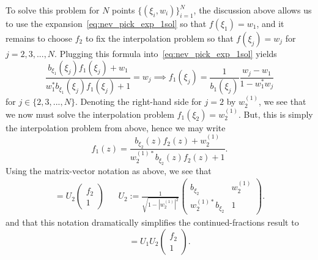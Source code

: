 To solve this problem for $N$ points $\{(\xi_i, w_i)\}_{i = 1}^N$, the discussion above allows us to use the expansion~\eqref{eq:nev_pick_exp_1sol} so that $f(\xi_1) = w_1$, and it remains to choose $f_2$ to fix the interpolation problem so that $f(\xi_j) = w_j$ for $j = 2, 3, ..., N$. Plugging this formula into~\eqref{eq:nev_pick_exp_1sol} yields 
\begin{equation}
    \frac{b_{\xi_1}(\xi_j) f_1(\xi_j) + w_1}{w_1^* b_{\xi_1}(\xi_j) f_1(\xi_j) + 1} = w_j \implies f_1(\xi_j) = \frac{1}{b_1(\xi_j)} \frac{w_j - w_1}{1 - w_1^* w_j}
\end{equation}
for $j\in\{2, 3, ..., N\}$. Denoting the right-hand side for $j = 2$ by $w_2^{(1)}$, we see that we now must solve the interpolation problem $f_1(\xi_2) = w_2^{(1)}$. But, this is simply the interpolation problem from above, hence we may write
\begin{equation}
    f_1(z) = \frac{b_{\xi_2}(z) f_2(z) + w_2^{(1)}}{w_{2}^{(1)*} b_{\xi_2}(z) f_2(z) + 1}. 
\end{equation}
Using the matrix-vector notation as above, we see that
\begin{align}
    [f_1] = U_2 \begin{pmatrix}
        f_2 \\ 1
    \end{pmatrix} && U_2 := \frac{1}{\sqrt{1 - |w_2^{(1)}|^2}} \begin{pmatrix}
        b_{\xi_2} & w_2^{(1)} \\ 
        w_2^{(1)*} b_{\xi_2} & 1
    \end{pmatrix}. 
\end{align}
and that this notation dramatically simplifies the continued-fractions result to 
\begin{equation}
    [f] = U_1 U_2 \begin{pmatrix}
        f_2 \\ 1
    \end{pmatrix}.
\end{equation}

